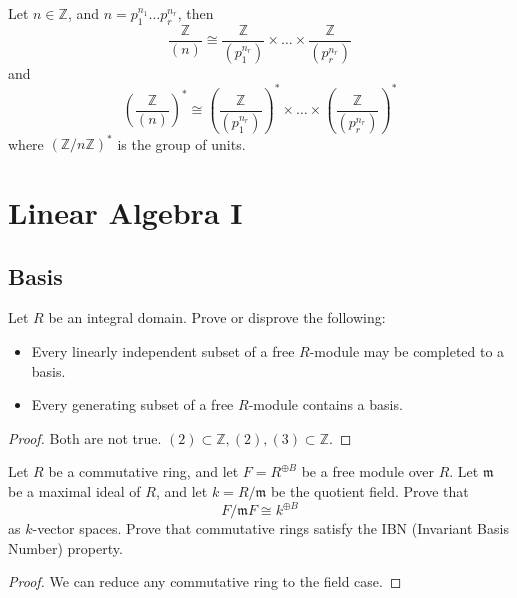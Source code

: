\documentclass[openany]{book}
\newcommand{\Z}{\mathbb{Z}}
\begin{document}
\begin{prop}[6.8]
    Let $n\in\Z$, and $n=p_1^{n_1}\dots p_r^{n_r}$, then 
    \begin{equation*}
        \frac{\Z}{(n)}\cong\frac{\Z}{(p_1^{n_r})}\times\dots\times\frac{\Z}{(p_r^{n_r})}
    \end{equation*}
    and 
    \begin{equation*}
        \left(\frac{\Z}{(n)}\right)^*\cong\left(\frac{\Z}{(p_1^{n_r})}\right)^*\times\dots\times\left(\frac{\Z}{(p_r^{n_r})}\right)^*
    \end{equation*}
    where $(\Z/n\Z)^*$ is the group of units.
\end{prop}





























\chapter{Linear Algebra I}

\section{Basis}
\begin{prob}[1.5]
    Let \( R \) be an integral domain. Prove or disprove the following:
\begin{itemize}
    \item Every linearly independent subset of a free \( R \)-module may be completed to a basis.
    \item Every generating subset of a free \( R \)-module contains a basis.
\end{itemize}
\end{prob}
\begin{proof}
    Both are not true. $(2)\subset\Z, (2),(3)\subset\Z$.
\end{proof}

\begin{prob}[1.11]
    Let \( R \) be a commutative ring, and let \( F = R^{\oplus B} \) be a free module over \( R \). Let \( \mathfrak{m} \) be a maximal ideal of \( R \), and let \( k = R/\mathfrak{m} \) be the quotient field. Prove that
\[
F/\mathfrak{m}F \cong k^{\oplus B}
\]
as \( k \)-vector spaces. Prove that commutative rings satisfy the IBN (Invariant Basis Number) property.
\end{prob}
\begin{proof}
    We can reduce any commutative ring to the field case.
\end{proof}
\end{document}
